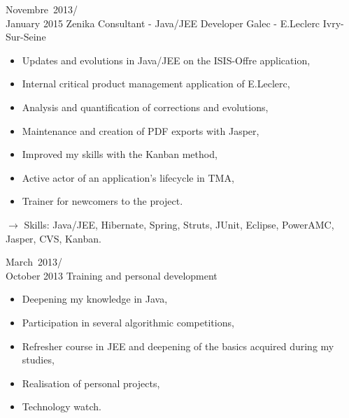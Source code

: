 \documentclass[11pt,a4paper,sans]{moderncv}
\begin{document}
\cventry
{Novembre\ 2013/\\January 2015}
{Zenika Consultant - Java/JEE Developer}
{Galec - E.Leclerc}
{Ivry-Sur-Seine}
{}
{\begin{itemize}
    \item Updates and evolutions in Java/JEE on the ISIS-Offre application,
    \item Internal critical product management application of E.Leclerc,
    \item Analysis and quantification of corrections and evolutions,
    \item Maintenance and creation of PDF exports with Jasper,
    \item Improved my skills with the Kanban method,
    \item Active actor of an application's lifecycle in TMA,
    \item Trainer for newcomers to the project.
\end{itemize}
$\rightarrow$ Skills: Java/JEE, Hibernate, Spring, Struts, JUnit, Eclipse, PowerAMC, Jasper, CVS, Kanban.
}   %

\cventry
{March\ 2013/\\October 2013}
{Training and personal development}{}{}{}
{\begin{itemize}
    \item Deepening my knowledge in Java,
    \item Participation in several algorithmic competitions,
    \item Refresher course in JEE and deepening of the basics acquired during my studies,
    \item Realisation of personal projects,
    \item Technology watch.
\end{itemize}
}   %
\end{document}
